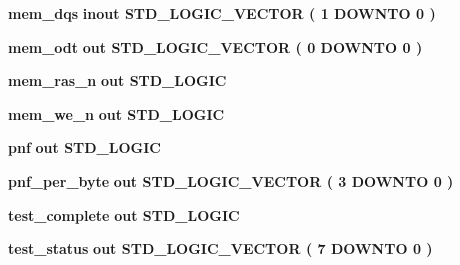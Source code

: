 \begin{DoxyCompactItemize}
\item 
{\bf mem\+\_\+dqs}  {\bfseries {\bfseries \textcolor{keywordflow}{inout}\textcolor{vhdlchar}{ }}} {\bfseries \textcolor{comment}{S\+T\+D\+\_\+\+L\+O\+G\+I\+C\+\_\+\+V\+E\+C\+T\+OR}\textcolor{vhdlchar}{ }\textcolor{vhdlchar}{(}\textcolor{vhdlchar}{ }\textcolor{vhdlchar}{ } \textcolor{vhdldigit}{1} \textcolor{vhdlchar}{ }\textcolor{keywordflow}{D\+O\+W\+N\+TO}\textcolor{vhdlchar}{ }\textcolor{vhdlchar}{ } \textcolor{vhdldigit}{0} \textcolor{vhdlchar}{ }\textcolor{vhdlchar}{)}\textcolor{vhdlchar}{ }} 
\item 
{\bf mem\+\_\+odt}  {\bfseries {\bfseries \textcolor{keywordflow}{out}\textcolor{vhdlchar}{ }}} {\bfseries \textcolor{comment}{S\+T\+D\+\_\+\+L\+O\+G\+I\+C\+\_\+\+V\+E\+C\+T\+OR}\textcolor{vhdlchar}{ }\textcolor{vhdlchar}{(}\textcolor{vhdlchar}{ }\textcolor{vhdlchar}{ } \textcolor{vhdldigit}{0} \textcolor{vhdlchar}{ }\textcolor{keywordflow}{D\+O\+W\+N\+TO}\textcolor{vhdlchar}{ }\textcolor{vhdlchar}{ } \textcolor{vhdldigit}{0} \textcolor{vhdlchar}{ }\textcolor{vhdlchar}{)}\textcolor{vhdlchar}{ }} 
\item 
{\bf mem\+\_\+ras\+\_\+n}  {\bfseries {\bfseries \textcolor{keywordflow}{out}\textcolor{vhdlchar}{ }}} {\bfseries \textcolor{comment}{S\+T\+D\+\_\+\+L\+O\+G\+IC}\textcolor{vhdlchar}{ }} 
\item 
{\bf mem\+\_\+we\+\_\+n}  {\bfseries {\bfseries \textcolor{keywordflow}{out}\textcolor{vhdlchar}{ }}} {\bfseries \textcolor{comment}{S\+T\+D\+\_\+\+L\+O\+G\+IC}\textcolor{vhdlchar}{ }} 
\item 
{\bf pnf}  {\bfseries {\bfseries \textcolor{keywordflow}{out}\textcolor{vhdlchar}{ }}} {\bfseries \textcolor{comment}{S\+T\+D\+\_\+\+L\+O\+G\+IC}\textcolor{vhdlchar}{ }} 
\item 
{\bf pnf\+\_\+per\+\_\+byte}  {\bfseries {\bfseries \textcolor{keywordflow}{out}\textcolor{vhdlchar}{ }}} {\bfseries \textcolor{comment}{S\+T\+D\+\_\+\+L\+O\+G\+I\+C\+\_\+\+V\+E\+C\+T\+OR}\textcolor{vhdlchar}{ }\textcolor{vhdlchar}{(}\textcolor{vhdlchar}{ }\textcolor{vhdlchar}{ } \textcolor{vhdldigit}{3} \textcolor{vhdlchar}{ }\textcolor{keywordflow}{D\+O\+W\+N\+TO}\textcolor{vhdlchar}{ }\textcolor{vhdlchar}{ } \textcolor{vhdldigit}{0} \textcolor{vhdlchar}{ }\textcolor{vhdlchar}{)}\textcolor{vhdlchar}{ }} 
\item 
{\bf test\+\_\+complete}  {\bfseries {\bfseries \textcolor{keywordflow}{out}\textcolor{vhdlchar}{ }}} {\bfseries \textcolor{comment}{S\+T\+D\+\_\+\+L\+O\+G\+IC}\textcolor{vhdlchar}{ }} 
\item 
{\bf test\+\_\+status}  {\bfseries {\bfseries \textcolor{keywordflow}{out}\textcolor{vhdlchar}{ }}} {\bfseries \textcolor{comment}{S\+T\+D\+\_\+\+L\+O\+G\+I\+C\+\_\+\+V\+E\+C\+T\+OR}\textcolor{vhdlchar}{ }\textcolor{vhdlchar}{(}\textcolor{vhdlchar}{ }\textcolor{vhdlchar}{ } \textcolor{vhdldigit}{7} \textcolor{vhdlchar}{ }\textcolor{keywordflow}{D\+O\+W\+N\+TO}\textcolor{vhdlchar}{ }\textcolor{vhdlchar}{ } \textcolor{vhdldigit}{0} \textcolor{vhdlchar}{ }\textcolor{vhdlchar}{)}\textcolor{vhdlchar}{ }} 
\end{DoxyCompactItemize}


